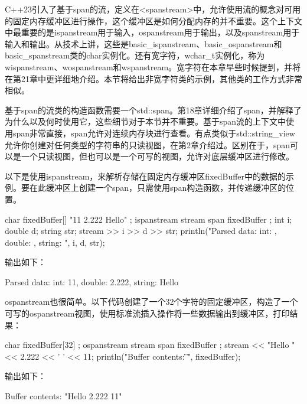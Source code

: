

C++23引入了基于span的流，定义在<spanstream>中，允许使用流的概念对可用的固定内存缓冲区进行操作，这个缓冲区是如何分配内存的并不重要。这个上下文中最重要的是ispanstream用于输入，ospanstream用于输出，以及spanstream用于输入和输出。从技术上讲，这些是basic\_ispanstream、basic\_ospanstream和basic\_spanstream类的char实例化。还有宽字符，wchar\_t实例化，称为wispanstream、wospanstream和wspanstream。宽字符在本章早些时候提到，并将在第21章中更详细地介绍。本节将给出非宽字符类的示例，其他类的工作方式非常相似。

基于span的流类的构造函数需要一个std::span。第18章详细介绍了span，并解释了为什么以及何时使用它，这些细节对于本节并不重要。基于span流的上下文中使用span非常直接，span允许对连续内存块进行查看。有点类似于std::string\_view允许你创建对任何类型的字符串的只读视图，在第2章介绍过。区别在于，span可以是一个只读视图，但也可以是一个可写的视图，允许对底层缓冲区进行修改。

以下是使用ispanstream，来解析存储在固定内存缓冲区fixedBuffer中的数据的示例。要在此缓冲区上创建一个span，只需使用span构造函数，并传递缓冲区的位置。

\begin{cpp}
char fixedBuffer[] { "11 2.222 Hello" };
ispanstream stream { span { fixedBuffer } };
int i; double d; string str;
stream >> i >> d >> str;
println("Parsed data: int: {}, double: {}, string: {}", i, d, str);
\end{cpp}

输出如下：

\begin{shell}
Parsed data: int: 11, double: 2.222, string: Hello
\end{shell}

ospanstream也很简单。以下代码创建了一个32个字符的固定缓冲区，构造了一个可写的ospanstream视图，使用标准流插入操作将一些数据输出到缓冲区，打印结果：

\begin{cpp}
char fixedBuffer[32] {};
ospanstream stream { span { fixedBuffer } };
stream << "Hello " << 2.222 << ' ' << 11;
println("Buffer contents: \"{}\"", fixedBuffer);
\end{cpp}

输出如下：

\begin{shell}
Buffer contents: "Hello 2.222 11"
\end{shell}






